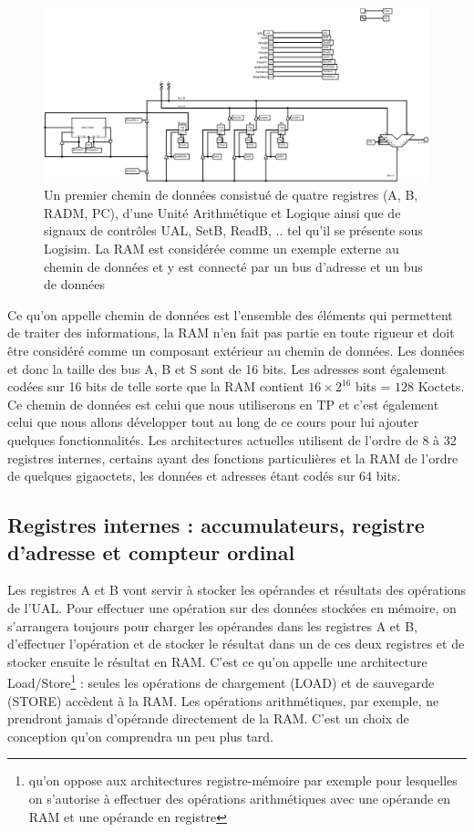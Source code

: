 \begin{figure}[htbp]
\includegraphics[width=\columnwidth]{Figs/premier_chemin_donnees.pdf}
\caption{\label{fig:premier_chemin_logisim} Un premier chemin de données consistué de quatre registres (A, B, RADM, PC), d'une Unité Arithmétique et Logique ainsi que de signaux de contrôles UAL, SetB, ReadB, .. tel qu'il se présente sous Logisim. La RAM est considérée comme un exemple externe au chemin de données et y est connecté par un bus d'adresse et un bus de données}
\end{figure}

Ce qu'on appelle chemin de données est l'ensemble des éléments qui permettent de traiter des informations, la RAM n'en fait pas partie en toute rigueur et doit être considéré comme un composant extérieur au chemin de données. Les données et donc la taille des bus A, B et S sont de 16 bits. Les adresses sont également codées sur 16 bits de telle sorte que la RAM contient $16 \times 2^{16}$ bits = $128$ Koctets. Ce chemin de données est celui que nous utiliserons en TP et c'est également celui que nous allons développer tout au long de ce cours pour lui ajouter quelques fonctionnalités. Les architectures actuelles utilisent de l'ordre de 8 à 32 registres internes, certains ayant des fonctions particulières et la RAM de l'ordre de quelques gigaoctets, les données et adresses étant codés sur 64 bits. 

\subsection{Registres internes : accumulateurs, registre d'adresse et compteur ordinal}

Les registres A et B vont servir à stocker les opérandes et résultats des opérations de l'UAL. Pour effectuer une opération sur des données stockées en mémoire, on s'arrangera toujours pour charger les opérandes dans les registres A et B, d'effectuer l'opération et de stocker le résultat dans un de ces deux registres et de stocker ensuite le résultat en RAM. C'est ce qu'on appelle une architecture Load/Store\footnote{qu'on oppose aux architectures registre-mémoire par exemple pour lesquelles on s'autorise à effectuer des opérations arithmétiques avec une opérande en RAM et une opérande en registre} : seules les opérations de chargement (LOAD) et de sauvegarde (STORE) accèdent à la RAM. Les opérations arithmétiques, par exemple, ne prendront jamais d'opérande directement de la RAM. C'est un choix de conception qu'on comprendra un peu plus tard.

